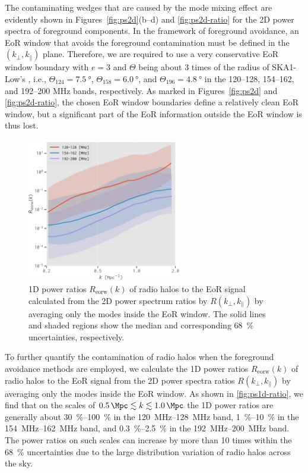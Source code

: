 \documentclass[modern]{aastex62}
\newcommand{\R}[1]{\mathrm{#1}}
\newcommand{\klos}{\text{$k_{\parallel}$}}
\newcommand{\kperp}{\text{$k_{\bot}$}}
\newcommand{\fov}{\text{Fo\!V}}
\begin{document}
{The contaminating wedges that are caused by the mode mixing effect are
evidently shown in Figures~\ref{fig:ps2d}(b--d) and \ref{fig:ps2d-ratio}
for the 2D power spectra of foreground components.
In the framework of foreground avoidance, an EoR window that avoids the
foreground contamination must be defined in the $(\kperp, \klos)$ plane.
Therefore, we are required to use a very conservative EoR window boundary
with $e = 3$ and $\Theta$ being about 3 times of the radius of SKA1-Low's
\fov, i.e., $\Theta_{124} = \SI{7.5}{\degree}$,
$\Theta_{158} = \SI{6.0}{\degree}$, and $\Theta_{196} = \SI{4.8}{\degree}$
in the \numrange{120}{128}, \numrange{154}{162}, and \numrange{192}{200}
\si{\MHz} bands, respectively.
As marked in Figures~\ref{fig:ps2d} and \ref{fig:ps2d-ratio},
the chosen EoR window boundaries define a relatively clean EoR window,
but a significant part of the EoR information outside the EoR window
is thus lost.

\begin{figure}
  \centering
  \includegraphics[width=0.6\textwidth]{ps1d-ratio-3bands}
  \caption{\label{fig:ps1d-ratio}%
    1D power ratios $R_{\R{eorw}}(k)$ of radio halos to the EoR signal
    calculated from the 2D power spectrum ratios by $R(\kperp, \klos)$
    by averaging only the modes inside the EoR window.
    The solid lines and shaded regions show the median and
    corresponding \SI{68}{\percent} uncertainties, respectively.
  }
\end{figure}

To further quantify the contamination of radio halos when the foreground
avoidance methods are employed, we calculate the 1D power ratios
$R_{\R{eorw}}(k)$ of radio halos to the EoR signal from the 2D power
spectra ratios $R(\kperp, \klos)$ by averaging only the modes inside the
EoR window.
As shown in \autoref{fig:ps1d-ratio}, we find that on the scales of
$\SI{0.5}{\per\Mpc} \lesssim k \lesssim \SI{1.0}{\per\Mpc}$ the 1D power
ratios are generally about
\SIrange[range-units=repeat]{30}{100}{\percent}
in the \SIrange{120}{128}{\MHz} band,
\SIrange[range-units=repeat]{1}{10}{\percent}
in the \SIrange{154}{162}{\MHz} band,
and \SIrange[range-units=repeat]{0.3}{2.5}{\percent}
in the \SIrange{192}{200}{\MHz} band.
The power ratios on such scales can increase by more than 10 times
within the \SI{68}{\percent} uncertainties due to the large distribution
variation of radio halos across the sky.

}
\end{document}
